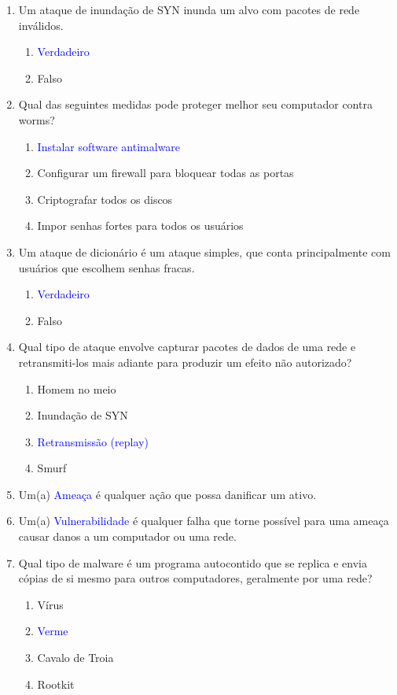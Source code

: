 \documentclass{report}
\begin{document}
\begin{enumerate}
		\item Um ataque de inundação de SYN inunda um alvo com pacotes de rede inválidos.  
		\begin{enumerate}[label=(\alph*)]
			\item \textcolor{blue}{Verdadeiro}
			\item Falso
		\end{enumerate}
		
		\item Qual das seguintes medidas pode proteger melhor seu computador contra worms?  
		\begin{enumerate}[label=(\alph*)]
			\item \textcolor{blue}{Instalar software antimalware}
			\item Configurar um firewall para bloquear todas as portas
			\item Criptografar todos os discos
			\item Impor senhas fortes para todos os usuários
		\end{enumerate}
		
		\item Um ataque de dicionário é um ataque simples, que conta principalmente com usuários que escolhem senhas fracas.  
		\begin{enumerate}[label=(\alph*)]
			\item \textcolor{blue}{Verdadeiro}
			\item Falso
		\end{enumerate}
		
		\item Qual tipo de ataque envolve capturar pacotes de dados de uma rede e retransmiti-los mais adiante para produzir um efeito não autorizado?  
		\begin{enumerate}[label=(\alph*)]
			\item Homem no meio
			\item Inundação de SYN
			\item \textcolor{blue}{Retransmissão (replay)}
			\item Smurf
		\end{enumerate}
		
		\item Um(a) \textcolor{blue}{Ameaça} é qualquer ação que possa danificar um ativo.
		
		\item Um(a) \textcolor{blue}{Vulnerabilidade} é qualquer falha que torne possível para uma ameaça causar danos a um computador ou uma rede.
		
		\item Qual tipo de malware é um programa autocontido que se replica e envia cópias de si mesmo para outros computadores, geralmente por uma rede?  
		\begin{enumerate}[label=(\alph*)]
			\item Vírus
			\item \textcolor{blue}{Verme}
			\item Cavalo de Troia
			\item Rootkit
		\end{enumerate}
		
	\end{enumerate}
	
\end{document}
